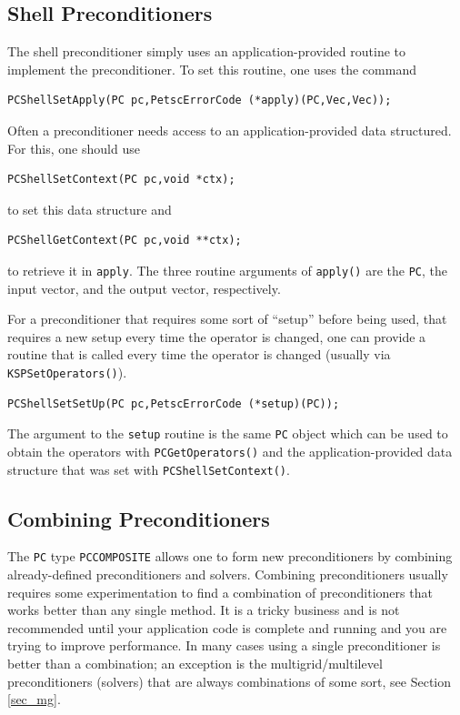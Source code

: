 \subsection{Shell Preconditioners}

The shell preconditioner simply uses an application-provided routine to
implement the preconditioner. To set this routine, one uses the
command
\begin{lstlisting}
PCShellSetApply(PC pc,PetscErrorCode (*apply)(PC,Vec,Vec));
\end{lstlisting}
Often a preconditioner needs access to an application-provided data
structured.  For this, one should use
\begin{lstlisting}
PCShellSetContext(PC pc,void *ctx);
\end{lstlisting}
to set this data structure and
\begin{lstlisting}
PCShellGetContext(PC pc,void **ctx);
\end{lstlisting}
to retrieve it in \lstinline{apply}.  The three routine arguments of
\lstinline{apply()} are the \lstinline{PC}, the input vector, and the output vector,
respectively.

For a preconditioner that requires some sort of ``setup'' before being used,
that requires a new setup every time the operator is changed, one can
provide a routine that is called every time the operator is
changed (usually via \lstinline{KSPSetOperators()}).
\begin{lstlisting}
PCShellSetSetUp(PC pc,PetscErrorCode (*setup)(PC));
\end{lstlisting}
The argument to the \lstinline{setup} routine is the same \lstinline{PC} object which
can be used to obtain the operators with \lstinline{PCGetOperators()} and the
application-provided data structure that was set with \lstinline{PCShellSetContext()}.

\subsection{Combining Preconditioners\label{sec:combining-pcs}} 

The \lstinline{PC} type \lstinline{PCCOMPOSITE} allows one to form
new preconditioners by combining already-defined preconditioners and
solvers. Combining preconditioners usually requires some experimentation
to find a combination of preconditioners that works better than any
single method. It is a tricky business and is not recommended until
your application code is complete and running and you are trying to
improve performance. In many cases using a single preconditioner is better
than a combination; an exception is the multigrid/multilevel preconditioners
(solvers) that are always combinations of some sort, see Section \ref{sec_mg}.

